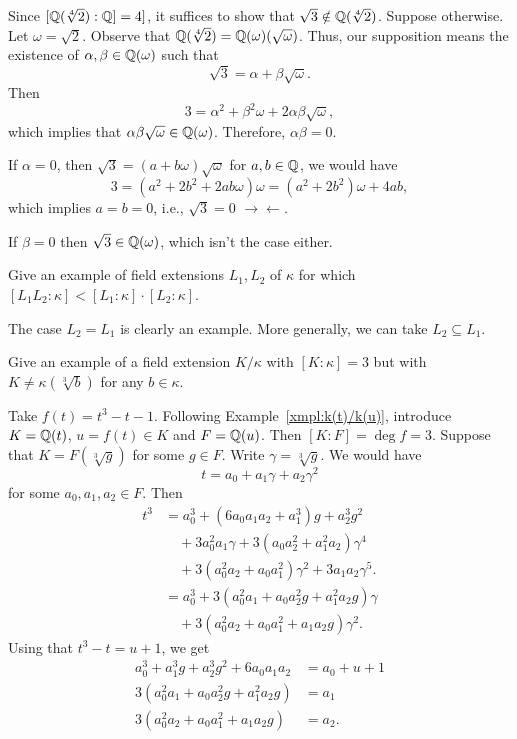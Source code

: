 \begin{solution}
    Since $[\mathbb{Q}(\sqrt[4]{2}):\mathbb{Q}]=4]$, it suffices to show that $\sqrt3\notin\mathbb{Q}(\sqrt[4]2)$. Suppose otherwise. Let $\omega=\sqrt2$. Observe that $\mathbb{Q}(\sqrt[4]{2})=\mathbb{Q}(\omega)(\sqrt\omega)$. Thus, our supposition means the existence of $\alpha,\beta\in\mathbb{Q}(\omega)$ such that
    $$
        \sqrt3 = \alpha + \beta\sqrt\omega.
    $$
    Then
    $$
        3 = \alpha^2+\beta^2\omega + 2\alpha\beta\sqrt\omega,
    $$
    which implies that $\alpha\beta\sqrt\omega\in\mathbb{Q}(\omega)$. Therefore, $\alpha\beta=0$.
    
    If $\alpha=0$, then $\sqrt3=(a+b\omega)\sqrt\omega$ for $a,b\in\mathbb{Q}$, we would have
    $$
        3=(a^2+2b^2+2ab\omega)\omega = (a^2+2b^2)\omega+4ab,
    $$
    which implies $a=b=0$, i.e., $\sqrt3=0$ $\to\leftarrow$.
    
    If $\beta=0$ then $\sqrt3\in\mathbb{Q}(\omega)$, which isn't the case either.
\end{solution}

\begin{probl}
    Give an example of field extensions\/ $L_1, L_2$ of\/ $\kappa$ for which\/ $[L_1 L_2:\kappa] < [L_1:\kappa] \cdot [L_2:\kappa]$.
\end{probl}

\begin{solution}
    The case $L_2=L_1$ is clearly an example. More generally, we can take $L_2\subseteq L_1$.
\end{solution}

\begin{probl}
    Give an example of a field extension\/ $K/\kappa$ with\/ $[K:\kappa] = 3$ but with\/ $K \neq \kappa(\sqrt[3]b)$ for any\/ $b \in \kappa$.
\end{probl}

\begin{solution}
    Take $f(t)=t^3-t-1$. Following Example~\ref{xmpl:k(t)/k(u)}, introduce $K=\mathbb{Q}(t)$, $u=f(t)\in K$ and $F=\mathbb{Q}(u)$. Then $[K:F]=\deg f=3$. Suppose that $K=F(\sqrt[3]g)$ for some $g\in F$. Write $\gamma=\sqrt[3]g$. We would have
    $$
        t=a_0+a_1\gamma+a_2\gamma^2
    $$
    for some $a_0,a_1,a_2\in F$. Then
    \begin{align*}
        t^3 &= a_0^3+(6a_0a_1a_2+a_1^3)g + a_2^3g^2\\
            &\quad+ 3a_0^2a_1\gamma + 3(a_0a_2^2+a_1^2a_2)\gamma^4\\
            &\quad+ 3(a_0^2a_2+a_0a_1^2)\gamma^2 + 3a_1a_2\gamma^5.\\
            &= a_0^3 + 3(a_0^2a_1+a_0a_2^2g+a_1^2a_2g)\gamma\\
            &\quad+ 3(a_0^2a_2+a_0a_1^2+a_1a_2g)\gamma^2.
    \end{align*}
    Using that $t^3-t=u+1$, we get
    \begin{align*}
        a_0^3+a_1^3g+a_2^3g^2+6a_0a_1a_2 &= a_0+u+1\\
         3(a_0^2a_1+a_0a_2^2g+a_1^2a_2g) &= a_1\\
         3(a_0^2a_2+a_0a_1^2+a_1a_2g) &= a_2.
    \end{align*}
\end{solution}

